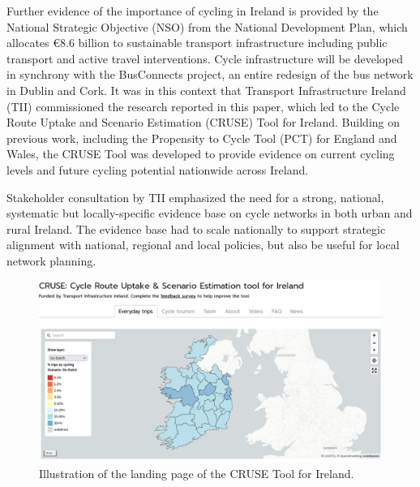 \documentclass[
  super,
  preprint,
  3p]{elsarticle}
\begin{document}
Further evidence of the importance of cycling in Ireland is provided by
the National Strategic Objective (NSO) from the National Development
Plan, which allocates €8.6 billion to sustainable transport
infrastructure including public transport and active travel
interventions. Cycle infrastructure will be developed in synchrony with
the BusConnects project, an entire redesign of the bus network in Dublin
and Cork. It was in this context that Transport Infrastructure Ireland
(TII) commissioned the research reported in this paper, which led to the
Cycle Route Uptake and Scenario Estimation (CRUSE) Tool for Ireland.
Building on previous work, including the Propensity to Cycle Tool (PCT)
for England and Wales, the CRUSE Tool was developed to provide evidence
on current cycling levels and future cycling potential nationwide across
Ireland.

Stakeholder consultation by TII emphasized the need for a strong,
national, systematic but locally-specific evidence base on cycle
networks in both urban and rural Ireland. The evidence base had to scale
nationally to support strategic alignment with national, regional and
local policies, but also be useful for local network planning.

\begin{figure}

{\centering 

\includegraphics{images/paste-10.png}

}

\caption{\label{fig-landing}Illustration of the landing page of the
CRUSE Tool for Ireland.}

\end{figure}
\end{document}
